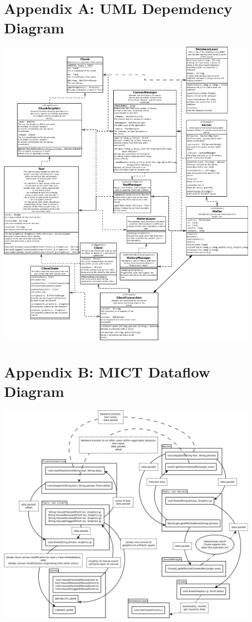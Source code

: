 \documentclass[11pt,oneside,a4paper]{article}
\begin{document}
\section{Appendix A: UML Depemdency Diagram}
 \begin{center}
  \includegraphics[width=130mm]{design_spec_appendix.png}
 \end{center}
 \section{Appendix B: MICT Dataflow Diagram}
 \begin{center}
 \includegraphics[width=130mm]{Dataflow.png}
 \end{center}
\end{document}
